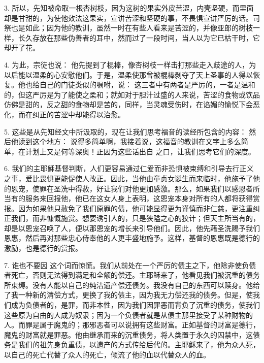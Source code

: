 3. 所以，先知被命取一根杏树枝，因为这树的果实外皮苦涩，内壳坚硬，而里面却是甘甜的，为使他效法这果实，宣讲苦涩和坚硬的事，不畏惧宣讲严厉的话。司祭也是如此；因为他的教训，虽然一时在有些人看来是苦涩的，并像亚郎的树枝一样，长久存放在那些伪善者的耳中，然而过了一段时间，当人以为它已枯干时，它却开了花。\par

4. 为此，宗徒也说：  他先提到了棍棒，像杏树枝一样击打那些走入歧途的人，为以后能以温柔的心安慰他们。于是，温柔使那曾被棍棒剥夺了天上圣事的人得以恢复。他也给自己的门徒类似的嘱咐，说：  这三者中有两者是严厉的，一者是温和的，但这严厉是为了能使之柔和；就如对于胆汁过盛的人来说，苦涩的食物或饮品仿佛是甜的，反之甜的食物却是苦的，同样，当灵魂受伤时，在谄媚的愉悦下会恶化，而在纠正的苦涩中却能得以治愈。\par

5. 这些是从先知经文中所汲取的，现在让我们思考福音的读经所包含的内容： 然后他读到这个地方： 说得多简单啊，我接着说，这福音的教训在文字上多么简单，在计划上又是何等深奥！正因为这些话出自   之口，让我们思考它们的深度。\par

6. 我们的主耶稣基督判断，人们更容易通过仁爱而非恐惧被束缚和引导去行正义之事，爱比畏惧更能促使人改正。因此，当他由童贞女诞生而来临时，他施予了他的恩宠，使罪在圣洗中得赦，好让我们对他更加感激。那么，如果我们以感恩者所当有的服务来回报他，他已在这女人身上表明，这恩宠本身对所有的人都将获得赏报。因为如果他只赦免了我们原罪的债，他可能显得更为谨慎而非仁慈，更注重纠正我们，而非慷慨施赏。想要诱引人的，只是狭隘之心的狡计；但天主所当有的，却是以恩宠召唤了人，便以那恩宠的增长来引导他们。因此，他先藉圣洗赐予我们恩惠，然后再对那些忠心侍奉他的人更丰盛地施予。这样，基督的恩惠既是德行的激励，也是德行的赏报。\par

7. 谁也不要因   这个词而惊慌。我们从前处在一个严厉的债主之下，他除非使负债者死亡，否则无法得到满足和全额的偿还。主耶稣来了，他看见我们被沉重的债务所束缚。没有人能以自己的纯洁遗产偿还债务。我没有自己的东西可以赎身。他给了我一种新的清偿方式，更换了我的债主，因为我无力偿还我的债务。但是，使我们成为负债者的，是罪，而非本性，因为我们因罪恶而背负了沉重的债务，使我们这些原为自由的人成为奴隶；因为一个负债者就是从债主那里接受了某种财物的人。而罪是属于魔鬼的；那邪恶者可以说拥有这些财富。正如基督的财富是德行，魔鬼的财富就是罪恶。他由继承而来的沉重债务，将人类置于永久的囚禁中，这债务是我们的祖先身负重债，以遗产的方式传给后代的。主耶稣来了，他为众人死，以自己的死亡代替了众人的死亡，倾流了他的血以代替众人的血。\par

